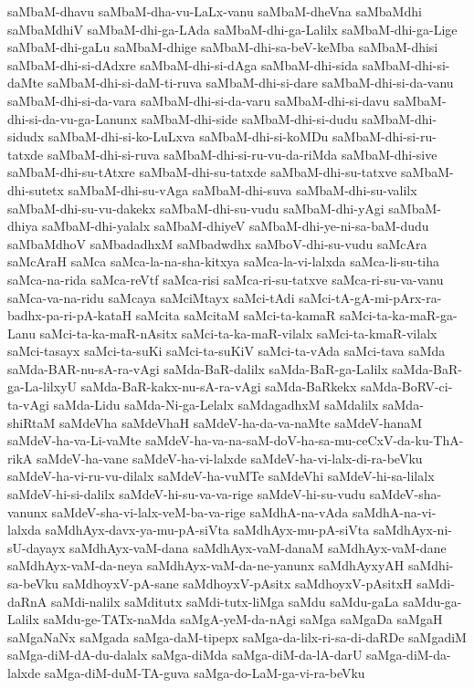 {saMbaM-dhavu
saMbaM-dha-vu-LaLx-vanu
saMbaM-dheVna
saMbaMdhi
saMbaMdhiV
saMbaM-dhi-ga-LAda
saMbaM-dhi-ga-Lalilx
saMbaM-dhi-ga-Lige
saMbaM-dhi-gaLu
saMbaM-dhige
saMbaM-dhi-sa-beV-keMba
saMbaM-dhisi
saMbaM-dhi-si-dAdxre
saMbaM-dhi-si-dAga
saMbaM-dhi-sida
saMbaM-dhi-si-daMte
saMbaM-dhi-si-daM-ti-ruva
saMbaM-dhi-si-dare
saMbaM-dhi-si-da-vanu
saMbaM-dhi-si-da-vara
saMbaM-dhi-si-da-varu
saMbaM-dhi-si-davu
saMbaM-dhi-si-da-vu-ga-Lanunx
saMbaM-dhi-side
saMbaM-dhi-si-dudu
saMbaM-dhi-sidudx
saMbaM-dhi-si-ko-LuLxva
saMbaM-dhi-si-koMDu
saMbaM-dhi-si-ru-tatxde
saMbaM-dhi-si-ruva
saMbaM-dhi-si-ru-vu-da-riMda
saMbaM-dhi-sive
saMbaM-dhi-su-tAtxre
saMbaM-dhi-su-tatxde
saMbaM-dhi-su-tatxve
saMbaM-dhi-sutetx
saMbaM-dhi-su-vAga
saMbaM-dhi-suva
saMbaM-dhi-su-valilx
saMbaM-dhi-su-vu-dakekx
saMbaM-dhi-su-vudu
saMbaM-dhi-yAgi
saMbaM-dhiya
saMbaM-dhi-yalalx
saMbaM-dhiyeV
saMbaM-dhi-ye-ni-sa-baM-dudu
saMbaMdhoV
saMbadadhxM
saMbadwdhx
saMboV-dhi-su-vudu
saMcAra
saMcAraH
saMca
saMca-la-na-sha-kitxya
saMca-la-vi-lalxda
saMca-li-su-tiha
saMca-na-rida
saMca-reVtf
saMca-risi
saMca-ri-su-tatxve
saMca-ri-su-va-vanu
saMca-va-na-ridu
saMcaya
saMciMtayx
saMci-tAdi
saMci-tA-gA-mi-pArx-ra-badhx-pa-ri-pA-kataH
saMcita
saMcitaM
saMci-ta-kamaR
saMci-ta-ka-maR-ga-Lanu
saMci-ta-ka-maR-nAsitx
saMci-ta-ka-maR-vilalx
saMci-ta-kmaR-vilalx
saMci-tasayx
saMci-ta-suKi
saMci-ta-suKiV
saMci-ta-vAda
saMci-tava
saMda
saMda-BAR-nu-sA-ra-vAgi
saMda-BaR-dalilx
saMda-BaR-ga-Lalilx
saMda-BaR-ga-La-lilxyU
saMda-BaR-kakx-nu-sA-ra-vAgi
saMda-BaRkekx
saMda-BoRV-ci-ta-vAgi
saMda-Lidu
saMda-Ni-ga-Lelalx
saMdagadhxM
saMdalilx
saMda-shiRtaM
saMdeVha
saMdeVhaH
saMdeV-ha-da-va-naMte
saMdeV-hanaM
saMdeV-ha-va-Li-vaMte
saMdeV-ha-va-na-saM-doV-ha-sa-mu-ceCxV-da-ku-ThA-rikA
saMdeV-ha-vane
saMdeV-ha-vi-lalxde
saMdeV-ha-vi-lalx-di-ra-beVku
saMdeV-ha-vi-ru-vu-dilalx
saMdeV-ha-vuMTe
saMdeVhi
saMdeV-hi-sa-lilalx
saMdeV-hi-si-dalilx
saMdeV-hi-su-va-va-rige
saMdeV-hi-su-vudu
saMdeV-sha-vanunx
saMdeV-sha-vi-lalx-veM-ba-va-rige
saMdhA-na-vAda
saMdhA-na-vi-lalxda
saMdhAyx-davx-ya-mu-pA-siVta
saMdhAyx-mu-pA-siVta
saMdhAyx-ni-sU-dayayx
saMdhAyx-vaM-dana
saMdhAyx-vaM-danaM
saMdhAyx-vaM-dane
saMdhAyx-vaM-da-neya
saMdhAyx-vaM-da-ne-yanunx
saMdhAyxyAH
saMdhi-sa-beVku
saMdhoyxV-pA-sane
saMdhoyxV-pAsitx
saMdhoyxV-pAsitxH
saMdi-daRnA
saMdi-nalilx
saMditutx
saMdi-tutx-liMga
saMdu
saMdu-gaLa
saMdu-ga-Lalilx
saMdu-ge-TATx-naMda
saMgA-yeM-da-nAgi
saMga
saMgaDa
saMgaH
saMgaNaNx
saMgada
saMga-daM-tipepx
saMga-da-lilx-ri-sa-di-daRDe
saMgadiM
saMga-diM-dA-du-dalalx
saMga-diMda
saMga-diM-da-lA-darU
saMga-diM-da-lalxde
saMga-diM-duM-TA-guva
saMga-do-LaM-ga-vi-ra-beVku
}
